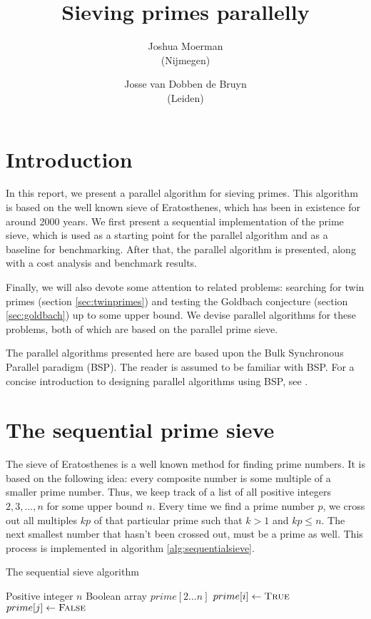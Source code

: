 \documentclass{article}
\author{Joshua Moerman\\(Nijmegen) \and Josse van Dobben de Bruyn\\(Leiden)}
\title{Sieving primes parallelly}
\begin{document}
\maketitle

\section{Introduction}
In this report, we present a parallel algorithm for sieving primes. This algorithm is based on the well known sieve of Eratosthenes, which has been in existence for around 2000 years. We first present a sequential implementation of the prime sieve, which is used as a starting point for the parallel algorithm and as a baseline for benchmarking. After that, the parallel algorithm is presented, along with a cost analysis and benchmark results.

Finally, we will also devote some attention to related problems: searching for twin primes (section \ref{sec:twinprimes}) and testing the Goldbach conjecture (section \ref{sec:goldbach}) up to some upper bound. We devise parallel algorithms for these problems, both of which are based on the parallel prime sieve.

The parallel algorithms presented here are based upon the Bulk Synchronous Parallel paradigm (BSP). The reader is assumed to be familiar with BSP. For a concise introduction to designing parallel algorithms using BSP, see \cite{Bisseling}.

\section{The sequential prime sieve}
The sieve of Eratosthenes is a well known method for finding prime numbers. It is based on the following idea: every composite number is some multiple of a smaller prime number. Thus, we keep track of a list of all positive integers $2,3,\ldots,n$ for some upper bound $n$. Every time we find a prime number $p$, we cross out all multiples $kp$ of that particular prime such that $k > 1$ and $kp \leq n$. The next smallest number that hasn't been crossed out, must be a prime as well. This process is implemented in algorithm \ref{alg:sequentialsieve}.

\begin{algorithm}
	\caption{The sequential sieve algorithm}
	\label{alg:sequentialsieve}
	\begin{algorithmic}[1]
		\Require Positive integer $n$
		\Ensure Boolean array $prime[2...n]$
		\State {}
			\State $prime[i] \gets \textsc{True}$
		\EndFor
		\State {}
		\label{alg:sqrtn}
				\label{alg:begincrossout}
					\State $prime[j] \gets \textsc{False}$
				\EndFor\label{alg:endcrossout}
			\EndIf
		\EndFor
	\end{algorithmic}
\end{algorithm}
\end{document}
